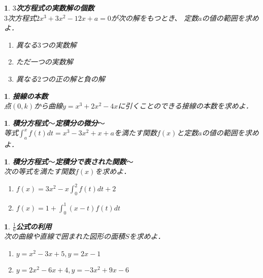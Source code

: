 \documentclass[10pt,
fleqn,
dvipdfmx,
uplatex
]{jsarticle}
\newtheorem{question}[Question]{}
\begin{document}
\begin{question}{\bf\boldmath $3$次方程式の実数解の個数}\\
$3$次方程式$2x^3+3x^2-{12}x+a=0$が次の解をもつとき、
定数$a$の値の範囲を求めよ．
\begin{enumerate}
\item 異なる$3$つの実数解
\item ただ一つの実数解
\item 異なる$2$つの正の解と負の解
\end{enumerate}

\end{question}



\begin{question}{\bf\boldmath 接線の本数}\\
点$\left(0,k\right)$から曲線$y=x^3+2x^2-4x$に引くことのできる接線の本数を求めよ．
\end{question}



\begin{question}{\bf\boldmath 積分方程式$〜$定積分の微分$〜$}\\
等式$\displaystyle\int_a^xf\left(t\right)dt=x^3-3x^2+x+a$を満たす関数$f\left(x\right)$と定数$a$の値の範囲を求めよ．
\end{question}



\begin{question}{\bf\boldmath 積分方程式$〜$定積分で表された関数$〜$}\\
次の等式を満たす関数$f\left(x\right)$を求めよ．
\begin{enumerate}
\item $f\left(x\right)=3x^2-x\displaystyle\int_0^2f\left(t\right)dt+2$
\item $f\left(x\right)=1+\displaystyle\int_0^1\left(x-t\right)f\left(t\right)dt$
\end{enumerate}

\end{question}



\begin{question}{\bf\boldmath $\displaystyle\frac{1}{6}$公式の利用}\\
次の曲線や直線で囲まれた図形の面積$S$を求めよ．
\begin{enumerate}
\item $y=x^2-3x+5, y=2x-1$
\item $y=2x^2-6x+4, y=-3x^2+9x-6$
\end{enumerate}

\end{question}
\end{document}
